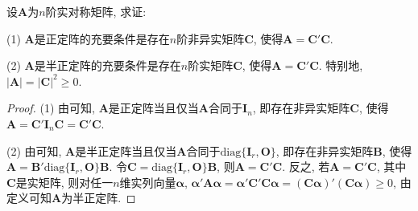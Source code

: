 \documentclass[../../main.tex]{subfiles}%
\begin{document}
\begin{proposition}[正定和半正定阵的判定准则之一]\label{proposition:正定和半正定阵的判定准则}
设$\boldsymbol{A}$为$n$阶实对称矩阵, 求证:

(1) $\boldsymbol{A}$是正定阵的充要条件是存在$n$阶非异实矩阵$\boldsymbol{C}$, 使得$\boldsymbol{A}=\boldsymbol{C}'\boldsymbol{C}$.

(2) $\boldsymbol{A}$是半正定阵的充要条件是存在$n$阶实矩阵$\boldsymbol{C}$, 使得$\boldsymbol{A}=\boldsymbol{C}'\boldsymbol{C}$. 特别地, $|\boldsymbol{A}| = |\boldsymbol{C}|^2\geqslant  0$.
\end{proposition}
\begin{proof}

(1) 由可知, $\boldsymbol{A}$是正定阵当且仅当$\boldsymbol{A}$合同于$\boldsymbol{I}_n$, 即存在非异实矩阵$\boldsymbol{C}$, 使得$\boldsymbol{A}=\boldsymbol{C}'\boldsymbol{I}_n\boldsymbol{C}=\boldsymbol{C}'\boldsymbol{C}$.

(2) 由可知, $\boldsymbol{A}$是半正定阵当且仅当$\boldsymbol{A}$合同于$\text{diag}\{\boldsymbol{I}_r, \boldsymbol{O}\}$, 即存在非异实矩阵$\boldsymbol{B}$, 使得$\boldsymbol{A}=\boldsymbol{B}'\text{diag}\{\boldsymbol{I}_r, \boldsymbol{O}\}\boldsymbol{B}$. 令$\boldsymbol{C}=\text{diag}\{\boldsymbol{I}_r, \boldsymbol{O}\}\boldsymbol{B}$, 则$\boldsymbol{A}=\boldsymbol{C}'\boldsymbol{C}$. 反之, 若$\boldsymbol{A}=\boldsymbol{C}'\boldsymbol{C}$, 其中$\boldsymbol{C}$是实矩阵, 则对任一$n$维实列向量$\boldsymbol{\alpha}$, $\boldsymbol{\alpha}'\boldsymbol{A}\boldsymbol{\alpha}=\boldsymbol{\alpha}'\boldsymbol{C}'\boldsymbol{C}\boldsymbol{\alpha}=(\boldsymbol{C}\boldsymbol{\alpha})'(\boldsymbol{C}\boldsymbol{\alpha})\geqslant  0$, 由定义可知$\boldsymbol{A}$为半正定阵.

\end{proof}
\end{document}
